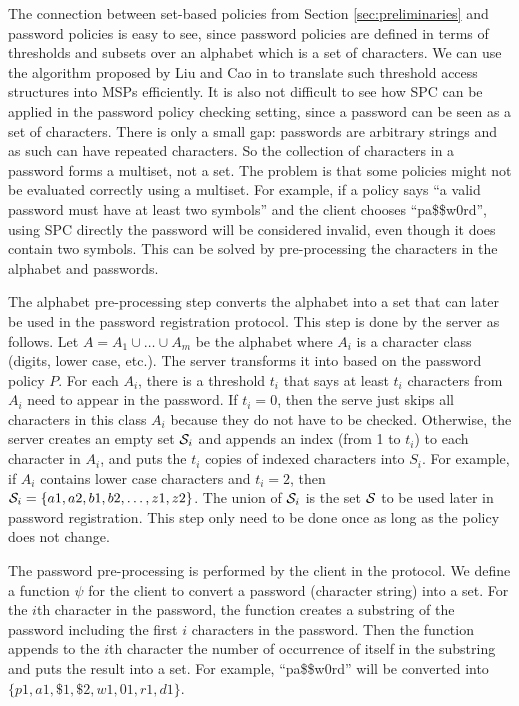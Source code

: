 The connection between set-based policies from Section \ref{sec:preliminaries} and password policies is easy to see, since password policies are defined in terms of thresholds and subsets over an alphabet which is a set of characters. We can use the algorithm proposed by Liu and Cao in \cite{LiuC10} to translate such threshold access structures into MSPs efficiently. It is also not difficult to see how SPC can be applied in the password policy checking setting, since a password can be seen as a set of characters. 
There is only a small gap: passwords are arbitrary strings and as such can have repeated characters. 
So the collection of characters in a password forms a multiset, not a set. 
The problem is that some policies might not be evaluated correctly using a multiset. 
For example, if a policy says ``a valid password must have at least two symbols'' and the client chooses ``pa\$\$w0rd'', using SPC directly the password will be considered invalid, even though it does contain two symbols. 
This can be solved by pre-processing the characters in the alphabet and passwords.

The alphabet pre-processing step converts the alphabet into a set that can later be used in the password registration protocol. This step is done by the server as follows. Let $A=A_1\cup\dots\cup A_m$ be the alphabet where $A_i$ is a character class (digits, lower case, etc.). The server transforms it into \cS based on the password policy $P$. 
For each $A_i$, there is a threshold $t_i$ that says at least $t_i$ characters from $A_i$ need to appear in the password. If $t_i = 0$, then the serve just skips all characters in this class $A_i$ because they do not have to be checked. Otherwise, the server creates an empty set $\mathcal{S}_i$ and appends an index (from 1 to $t_i$) to each character in $A_i$, and puts the $t_i$ copies of indexed characters into $S_i$. For example, if $A_i$ contains lower case characters and $t_i=2$, then $\mathcal{S}_i=\{a1,a2,b1,b2,\ldots,z1,z2\}$. The union of $\mathcal{S}_i$ is the set $\mathcal{S}$ to be used later in password registration. This step only need to be done once as long as the policy does not change.

The password pre-processing is performed by the client in the protocol. We define a function $\psi$ for the client to convert a password (character string) into a set. For the $i$th character in the password, the function creates a substring of the password including the first $i$ characters in the password. Then the function appends to the $i$th character the number of occurrence of itself in the substring and puts the result into a set. For example, ``pa\$\$w0rd'' will be converted into $\{p1,a1,\$1,\$2,w1,01,r1,d1\}$. 
 


